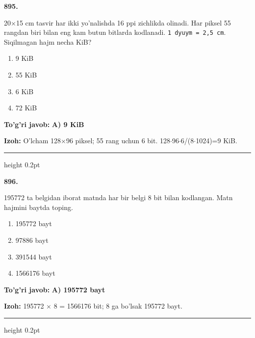 \documentclass[10pt,a4paper,oneside]{article}
\begin{document}
\noindent\textbf{\color{ink}895.}
\par
20\ensuremath{\times}15 cm tasvir har ikki yo'nalishda 16 ppi zichlikda olinadi. Har piksel 55 rangdan biri bilan eng kam butun bitlarda kodlanadi. \texttt{1 dyuym = 2,5 cm}. Siqilmagan hajm necha KiB?
\begin{enumerate}[label=\Alph*),leftmargin=9mm]
\item 9 KiB
\item 55 KiB
\item 6 KiB
\item 72 KiB
\end{enumerate}
\begin{tcolorbox}[enhanced,breakable,colback=teal!4,colframe=teal!50!black,boxrule=0.5pt,arc=1.1mm,left=3mm,right=3mm,top=1.7mm,bottom=1.7mm,before skip=2mm,after skip=2mm]
\textbf{\color{teal}To'g'ri javob:} \textbf{A) 9 KiB}
\par\smallskip
\textbf{Izoh:} O'lcham 128\ensuremath{\times}96 piksel; 55 rang uchun 6 bit. 128\ensuremath{\cdot}96\ensuremath{\cdot}6/(8\ensuremath{\cdot}1024)=9 KiB.
\end{tcolorbox}
\vspace{2mm}\hrule height 0.2pt \vspace{3mm}

\noindent\textbf{\color{ink}896.}
\par
195772 ta belgidan iborat matnda har bir belgi 8 bit bilan kodlangan. Matn hajmini baytda toping.
\begin{enumerate}[label=\Alph*),leftmargin=9mm]
\item 195772 bayt
\item 97886 bayt
\item 391544 bayt
\item 1566176 bayt
\end{enumerate}
\begin{tcolorbox}[enhanced,breakable,colback=teal!4,colframe=teal!50!black,boxrule=0.5pt,arc=1.1mm,left=3mm,right=3mm,top=1.7mm,bottom=1.7mm,before skip=2mm,after skip=2mm]
\textbf{\color{teal}To'g'ri javob:} \textbf{A) 195772 bayt}
\par\smallskip
\textbf{Izoh:} 195772 \ensuremath{\times} 8 = 1566176 bit; 8 ga bo'lsak 195772 bayt.
\end{tcolorbox}
\vspace{2mm}\hrule height 0.2pt \vspace{3mm}
\end{document}
